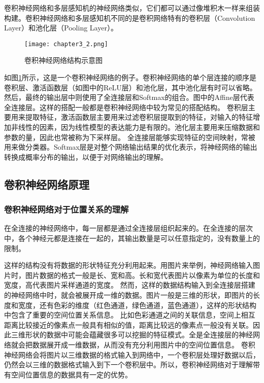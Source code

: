 卷积神经网络和多层感知机的神经网络类似，它们都可以通过像堆积木一样来组装构建。卷积神经网络和多层感知机不同的是卷积网络特有的卷积层（Convolution Layer）和池化层（Pooling Layer）。

\begin{figure}
    \centering
    \texttt{[image: chapter3\_2.png]}
    \caption{卷积神经网络结构示意图}
    \label{fig:chapter3_2}
\end{figure}

如图\ref{fig:chapter3_2}所示，这是一个卷积神经网络的例子。卷积神经网络的单个层连接的顺序是卷积层、激活函数层（如图中的ReLU层）和池化层，其中池化层有时可以省略。
然后，最终的输出层中则使用了全连接层和Softmax的组合。图中的Affine层代表全连接层。这样的搭配一般都是卷积神经网络中较为常见的搭配结构。
卷积层主要用来提取特征，激活函数层主要用来过滤卷积层提取到的特征，对输入的特征增加非线性的因素，因为线性模型的表达能力是有限的。池化层主要用来压缩数据和参数的量，因此也常被称为下采样层。
全连接层能够实现特征的空间映射，常被用来做分类器。Softmax层是对整个网络输出结果的优化表示，将神经网络的输出转换成概率分布的输出，以便于对网络输出的理解。

\subsection{卷积神经网络原理} 
\subsubsection{卷积神经网络对于位置关系的理解}
在全连接的神经网络中，每一层都是通过全连接层组织起来的。在全连接的层次中，各个神经元都是连接在一起的，其输出数量是可以任意指定的，没有数量上的限制。

这样的结构没有将数据的形状特征充分利用起来。用图片来举例，神经网络输入图片时，图片数据的格式一般是长、宽和高。长和宽代表图片以像素为单位的长度和宽度，高代表图片采样通道的宽度。
然而，这样的数据结构输入到全连接层搭建的神经网络中时，就会被展开成一维的数据。图片一般是三维的形状，即图片的长度和宽度，还有色彩的维度（红色通道，绿色通道，蓝色通道），这样的形状结构中包含了重要的空间位置关系信息。
比如色彩通道之间的关联信息，空间上相互距离比较接近的像素点一般具有相似的值，距离比较远的像素点一般没有关联。因此三维形状的数据中可能会蕴藏很多可以挖掘的特征模式。全是全连接层的神经网络就会把数据展开成一维数据，从而没有充分利用图片中的空间位置信息。
卷积神经网络会将图片以三维数据的格式输入到网络中，一个卷积层处理好数据以后，仍然会以三维的数据格式输入到下一个卷积层中。所以，卷积神经网络对于理解带有空间位置信息的数据具有一定的优势。

